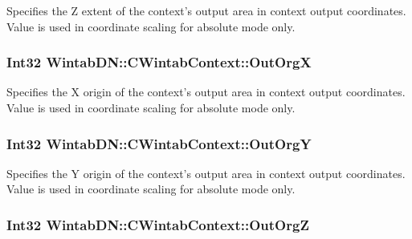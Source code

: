 Specifies the Z extent of the context's output area in context output coordinates. Value is used in coordinate scaling for absolute mode only. 

\hypertarget{class_wintab_d_n_1_1_c_wintab_context_a15ccc1a63dd18dcca3518d770dbade1c}{
\subsubsection[{OutOrgX}]{\setlength{\rightskip}{0pt plus 5cm}Int32 WintabDN::CWintabContext::OutOrgX}}
\label{class_wintab_d_n_1_1_c_wintab_context_a15ccc1a63dd18dcca3518d770dbade1c}


Specifies the X origin of the context's output area in context output coordinates. Value is used in coordinate scaling for absolute mode only. 

\hypertarget{class_wintab_d_n_1_1_c_wintab_context_ae59a99d957925924554d483a4eb386d0}{
\subsubsection[{OutOrgY}]{\setlength{\rightskip}{0pt plus 5cm}Int32 WintabDN::CWintabContext::OutOrgY}}
\label{class_wintab_d_n_1_1_c_wintab_context_ae59a99d957925924554d483a4eb386d0}


Specifies the Y origin of the context's output area in context output coordinates. Value is used in coordinate scaling for absolute mode only. 

\hypertarget{class_wintab_d_n_1_1_c_wintab_context_a9d4a0230b1d39404c34d24323f994796}{
\subsubsection[{OutOrgZ}]{\setlength{\rightskip}{0pt plus 5cm}Int32 WintabDN::CWintabContext::OutOrgZ}}
\label{class_wintab_d_n_1_1_c_wintab_context_a9d4a0230b1d39404c34d24323f994796}


